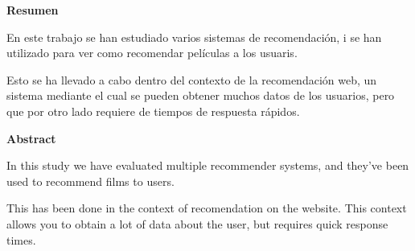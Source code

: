 \documentclass[a4paper,12pt,catalan]{book}
\begin{document}
{\par\centering \textbf{\large Resumen}\large \par}

En este trabajo se han estudiado varios sistemas de recomendación, i se han utilizado para ver como recomendar películas a los usuaris.

Esto se ha llevado a cabo dentro del contexto de la recomendación web, un sistema mediante el cual se pueden obtener muchos datos de los usuarios, pero que por otro lado requiere de tiempos de respuesta rápidos.

\vfill{}

{\par\centering \textbf{\large Abstract}\large \par}

In this study we have evaluated multiple recommender systems, and they've been used to recommend films to users.

This has been done in the context of recomendation on the website. This context allows you to obtain a lot of data about the user, but requires quick response times.

\vfill{}
\end{document}
